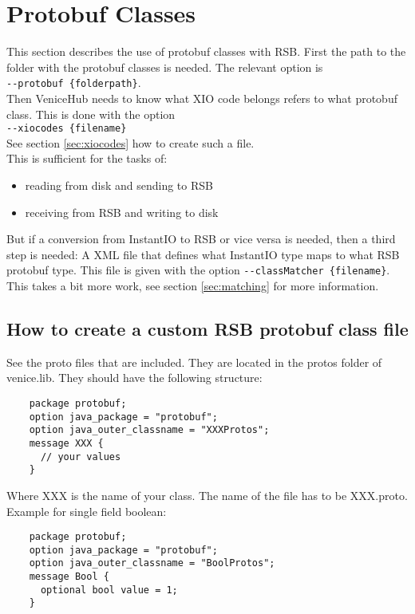 \documentclass[german,a4paper]{article}
\begin{document}
\section{Protobuf Classes}
\label{sec:protobuf}
This section describes the use of protobuf classes with RSB. First the path to the folder with the protobuf classes is needed. The relevant option is\\
\texttt{-\--protobuf \{folderpath\}}.\\
Then VeniceHub needs to know what XIO code belongs refers to what protobuf class. This is done with the option\\
\texttt{-\--xiocodes \{filename\}}\\
See section \ref{sec:xiocodes} how to create such a file.\\
This is sufficient for the tasks of:
\begin{itemize}
  \item reading from disk and sending to RSB
  \item receiving from RSB and writing to disk
\end{itemize}

But if a conversion from InstantIO to RSB or vice versa is needed, then a third step is needed: A XML file that defines what InstantIO type maps to what RSB protobuf type. This file is given with the option \texttt{-\--classMatcher \{filename\}}. This takes a bit more work, see section \ref{sec:matching} for more information.\\

\subsection{How to create a custom RSB protobuf class file}
See the proto files that are included.  They are located in the protos folder of venice.lib.  They should have the following structure:
\begin{lstlisting}
    package protobuf;
    option java_package = "protobuf";
    option java_outer_classname = "XXXProtos";
    message XXX {
      // your values
    }
\end{lstlisting}
Where XXX is the name of your class.  The name of the file has to be XXX.proto.\\

Example for single field boolean:
\begin{lstlisting}
    package protobuf;
    option java_package = "protobuf";
    option java_outer_classname = "BoolProtos";
    message Bool {
      optional bool value = 1;
    }
\end{lstlisting}
\end{document}
